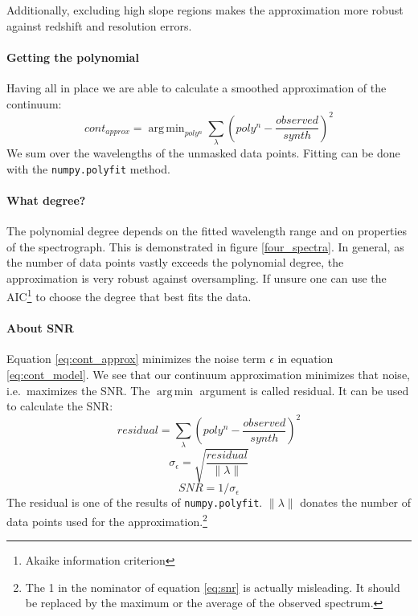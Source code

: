 \documentclass[10pt,a4paper,notitlepage,twocolumn]{article}
\DeclareMathOperator*{\argmin}{arg\,min}
\begin{document}
Additionally, excluding high slope regions makes the approximation more robust against redshift and resolution errors. 


\paragraph{Getting the polynomial}
Having all in place we are able to calculate a smoothed approximation of the continuum:
\begin{equation}
	\label{eq:cont_approx}
	cont_{approx} = \argmin_{poly^n} \sum_{\lambda} \left( poly^n - \frac{observed}{synth} \right)^2
\end{equation}
We sum over the wavelengths of the unmasked data points.
Fitting can be done with the \verb|numpy.polyfit| method.

\paragraph{What degree?}
The polynomial degree depends on the fitted wavelength range and on properties of the spectrograph.
This is demonstrated in figure \ref{four_spectra}.
In general, as the number of data points vastly exceeds the polynomial degree, the approximation is very robust against oversampling.
If unsure one can use the AIC\footnote{Akaike information criterion} \cite{Akaike1974} to choose the degree that best fits the data.

\paragraph{About SNR}
Equation \ref{eq:cont_approx} minimizes the noise term $\epsilon$ in equation \ref{eq:cont_model}.
We see that our continuum approximation minimizes that noise, i.e.\ maximizes the SNR.
The $\argmin$ argument is called residual. It can be used to calculate the SNR:
\begin{equation}
	residual = \sum_{\lambda} \left( poly^n - \frac{observed}{synth} \right)^2
\end{equation}
\begin{equation}
	\sigma_\epsilon = \sqrt{ \frac{residual}{\|\lambda\|}}
\end{equation}
\begin{equation}
	\label{eq:snr}
	SNR = 1 / \sigma_\epsilon
\end{equation}
The residual is one of the results of \verb|numpy.polyfit|.
$\|\lambda\|$ donates the number of data points used for the approximation.\footnote{The 1 in the nominator of equation \ref{eq:snr} is actually misleading. It should be replaced by the maximum or the average of the observed spectrum.}
\end{document}
